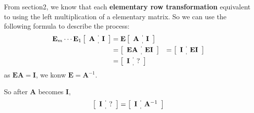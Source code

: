         From section2, we know that each \textbf{elementary row transformation} equivalent to 
        using the left multiplication of a  elementary matrix. So we can use the following formula to describe the process:
            \begin{equation}
                \begin{aligned}
                    \mathbf{E}_m
                    \cdots
                    \mathbf{E}_1
                    \left[
                        \begin{array}{c:c}
                            \mathbf{A} & \mathbf{I}
                        \end{array}
                    \right]  
                    &= \mathbf{E} 
                    \left[
                        \begin{array}{c:c}
                            \mathbf{A} & \mathbf{I}
                        \end{array}
                    \right]  \\
                    & = 
                    \left[
                        \begin{array}{c:c}
                            \mathbf{EA} & \mathbf{EI}
                        \end{array}
                    \right]  
                    &=
                    \left[
                        \begin{array}{c:c}
                            \mathbf{I} & \mathbf{EI}
                        \end{array}
                    \right] \\
                    &=
                    \left[
                        \begin{array}{c:c}
                            \mathbf{I} & \mathbf{?}
                        \end{array}
                    \right]
                \end{aligned}
            \end{equation}
            as $\mathbf{EA} = \mathbf{I}$, we konw $\mathbf{E} = \mathbf{A}^{-1}$.

            So after \textbf{A} becomes \textbf{I},
                \begin{equation}
                    \left[
                        \begin{array}{c:c}
                            \mathbf{I} & \mathbf{?}
                        \end{array}
                    \right]
                    = 
                    \left[
                        \begin{array}{c:c}
                            \mathbf{I} & \mathbf{A}^{-1}
                        \end{array}
                    \right]
                \end{equation}



        



        

    